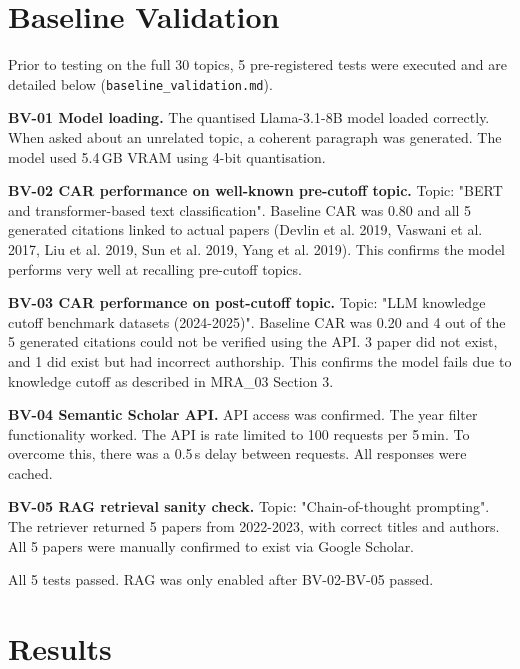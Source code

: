 \documentclass[conference]{IEEEtran}
\begin{document}
\section{Baseline Validation}
\label{sec:validation}

Prior to testing on the full 30 topics, 5 pre-registered tests were executed and
are detailed below (\texttt{baseline\_validation.md}).

\textbf{BV-01 Model loading.} The quantised Llama-3.1-8B model
loaded correctly. When asked about an unrelated topic, a coherent paragraph
was generated. The model used 5.4\,GB VRAM using 4-bit quantisation.

\textbf{BV-02 CAR performance on well-known pre-cutoff topic.}
Topic: "BERT and transformer-based text classification". Baseline CAR was
0.80 and all 5 generated citations linked to actual papers (Devlin et al.
2019, Vaswani et al. 2017, Liu et al. 2019, Sun et al. 2019, Yang
et al. 2019). This confirms the model performs very well at recalling
pre-cutoff topics.

\textbf{BV-03 CAR performance on post-cutoff topic.} Topic:
"LLM knowledge cutoff benchmark datasets (2024-2025)". Baseline CAR was
0.20 and 4 out of the 5 generated citations could not be verified using the
API. 3 paper did not exist, and 1 did exist but had incorrect authorship.
This confirms the model fails due to knowledge cutoff as described in
MRA\_03 Section 3.

\textbf{BV-04 Semantic Scholar API.} API access was confirmed. The year
filter functionality worked. The API is rate limited to 100 requests per
5\,min. To overcome this, there was a 0.5\,s delay between
requests. All responses were cached.

\textbf{BV-05 RAG retrieval sanity check.} Topic: "Chain-of-thought prompting".
The retriever returned 5 papers from 2022-2023, with correct titles and
authors. All 5 papers were manually confirmed to exist via Google Scholar.

All 5 tests passed. RAG was only enabled after BV-02-BV-05 passed.
\section{Results}
\label{sec:results}
\end{document}
